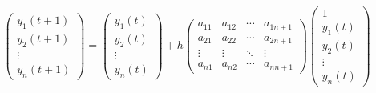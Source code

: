 \documentclass[a4j]{jarticle}
\begin{document}
    \begin{eqnarray}
      \left(
        \begin{array}{c}
          y_1(t+1)  \\
          y_2(t+1)  \\
          \vdots \\
          y_n(t+1) 
        \end{array}
      \right)
    =
    \left(
      \begin{array}{c}
        y_1(t)  \\
        y_2(t)  \\
        \vdots \\
        y_n(t) 
      \end{array}
    \right)
      +
      h\left(
        \begin{array}{cccc}
          a_{11} & a_{12} & \cdots & a_{1n+1} \\
          a_{21} & a_{22} & \cdots & a_{2n+1} \\
          \vdots & \vdots & \ddots & \vdots \\
          a_{n1} & a_{n2} & \cdots & a_{nn+1}
        \end{array}
      \right)
      \left(
        \begin{array}{c}
          1 \\
          y_1(t) \\
          y_2(t) \\
          \vdots \\
          y_n(t)
        \end{array}
      \right)
    \label{linear_case_mat_n}
  \end{eqnarray}
\end{document}
